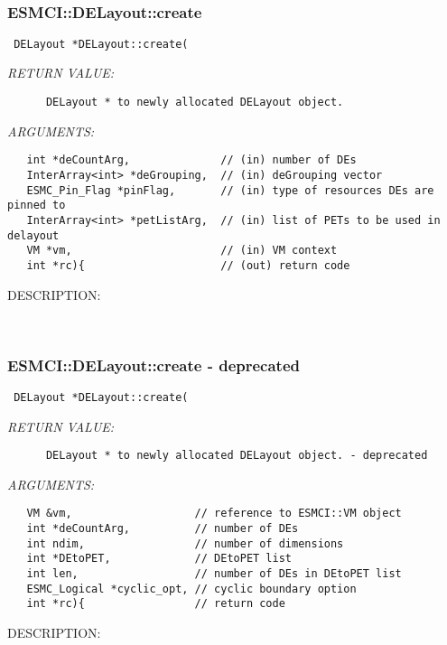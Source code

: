    
 
\mbox{}\hrulefill\
 
\subsubsection [ESMCI::DELayout::create] {ESMCI::DELayout::create}


  
\begin{verbatim} DELayout *DELayout::create(\end{verbatim}{\em RETURN VALUE:}
\begin{verbatim}      DELayout * to newly allocated DELayout object.\end{verbatim}{\em ARGUMENTS:}
\begin{verbatim}   int *deCountArg,              // (in) number of DEs
   InterArray<int> *deGrouping,  // (in) deGrouping vector
   ESMC_Pin_Flag *pinFlag,       // (in) type of resources DEs are pinned to
   InterArray<int> *petListArg,  // (in) list of PETs to be used in delayout
   VM *vm,                       // (in) VM context
   int *rc){                     // (out) return code\end{verbatim}
{\sf DESCRIPTION:\\ }


   
 
\mbox{}\hrulefill\
 
\subsubsection [ESMCI::DELayout::create] {ESMCI::DELayout::create - deprecated}


  
\begin{verbatim} DELayout *DELayout::create(\end{verbatim}{\em RETURN VALUE:}
\begin{verbatim}      DELayout * to newly allocated DELayout object. - deprecated\end{verbatim}{\em ARGUMENTS:}
\begin{verbatim}   VM &vm,                   // reference to ESMCI::VM object
   int *deCountArg,          // number of DEs
   int ndim,                 // number of dimensions
   int *DEtoPET,             // DEtoPET list
   int len,                  // number of DEs in DEtoPET list
   ESMC_Logical *cyclic_opt, // cyclic boundary option
   int *rc){                 // return code\end{verbatim}
{\sf DESCRIPTION:\\ }


